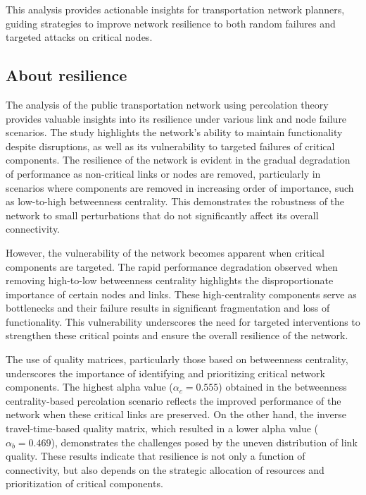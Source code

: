 \documentclass[
  letterpaper,
  DIV=11,
  numbers=noendperiod]{scrartcl}
\begin{document}
This analysis provides actionable insights for transportation network
planners, guiding strategies to improve network resilience to both
random failures and targeted attacks on critical nodes.

\subsection{About resilience}\label{about-resilience}

The analysis of the public transportation network using percolation
theory provides valuable insights into its resilience under various link
and node failure scenarios. The study highlights the network's ability
to maintain functionality despite disruptions, as well as its
vulnerability to targeted failures of critical components. The
resilience of the network is evident in the gradual degradation of
performance as non-critical links or nodes are removed, particularly in
scenarios where components are removed in increasing order of
importance, such as low-to-high betweenness centrality. This
demonstrates the robustness of the network to small perturbations that
do not significantly affect its overall connectivity.

However, the vulnerability of the network becomes apparent when critical
components are targeted. The rapid performance degradation observed when
removing high-to-low betweenness centrality highlights the
disproportionate importance of certain nodes and links. These
high-centrality components serve as bottlenecks and their failure
results in significant fragmentation and loss of functionality. This
vulnerability underscores the need for targeted interventions to
strengthen these critical points and ensure the overall resilience of
the network.

The use of quality matrices, particularly those based on betweenness
centrality, underscores the importance of identifying and prioritizing
critical network components. The highest alpha value
(\(\alpha_c = 0.555\)) obtained in the betweenness centrality-based
percolation scenario reflects the improved performance of the network
when these critical links are preserved. On the other hand, the inverse
travel-time-based quality matrix, which resulted in a lower alpha value
(\(\alpha_b = 0.469\)), demonstrates the challenges posed by the uneven
distribution of link quality. These results indicate that resilience is
not only a function of connectivity, but also depends on the strategic
allocation of resources and prioritization of critical components.
\end{document}
